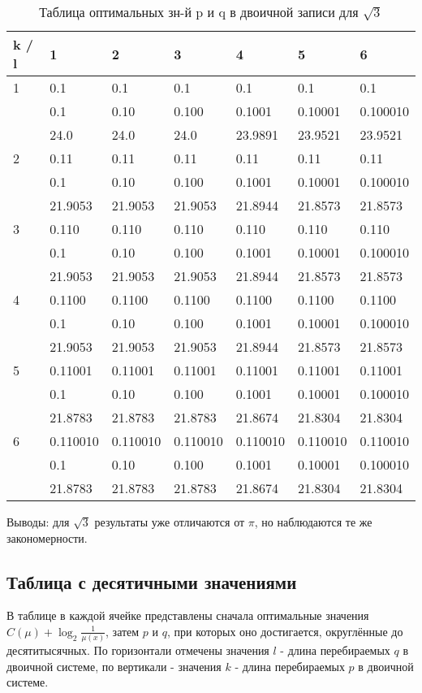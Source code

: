 \documentclass[12pt]{article}
\begin{document}
	\begin{table}[h]
		\caption{Таблица оптимальных зн-й p и q в двоичной записи для $\sqrt{3}$}
		\label{sometable}
		\begin{center}
			\begin{tabular}{|l|l|l|l|l|l|l|}
				\hline
				k / l &1 & 2 & 3 & 4 & 5 & 6\\
				\hline
				1 & 0.1& 0.1& 0.1& 0.1& 0.1& 0.1\\
				& 0.1& 0.10& 0.100& 0.1001& 0.10001& 0.100010\\
				& 24.0& 24.0& 24.0& 23.9891& 23.9521& 23.9521\\
				\hline
				2 & 0.11& 0.11& 0.11& 0.11& 0.11& 0.11\\
				& 0.1& 0.10& 0.100& 0.1001& 0.10001& 0.100010\\
				& 21.9053& 21.9053& 21.9053& 21.8944& 21.8573& 21.8573\\
				\hline
				3 & 0.110& 0.110& 0.110& 0.110& 0.110& 0.110\\
				& 0.1& 0.10& 0.100& 0.1001& 0.10001& 0.100010\\
				& 21.9053& 21.9053& 21.9053& 21.8944& 21.8573& 21.8573\\
				\hline
				4 & 0.1100& 0.1100& 0.1100& 0.1100& 0.1100& 0.1100\\
				& 0.1& 0.10& 0.100& 0.1001& 0.10001& 0.100010\\
				& 21.9053& 21.9053& 21.9053& 21.8944& 21.8573& 21.8573\\
				\hline
				5 & 0.11001& 0.11001& 0.11001& 0.11001& 0.11001& 0.11001\\
				& 0.1& 0.10& 0.100& 0.1001& 0.10001& 0.100010\\
				& 21.8783& 21.8783& 21.8783& 21.8674& 21.8304& 21.8304\\
				\hline
				6 & 0.110010& 0.110010& 0.110010& 0.110010& 0.110010& 0.110010\\
				& 0.1& 0.10& 0.100& 0.1001& 0.10001& 0.100010\\
				& 21.8783& 21.8783& 21.8783& 21.8674& 21.8304& 21.8304\\
				\hline
			\end{tabular}
		\end{center}
	\end{table}
	
	Выводы: для $\sqrt{3}$ результаты уже отличаются от $\pi$, но наблюдаются те же закономерности.
	
	\subsection*{Таблица с десятичными значениями}
	В таблице в каждой ячейке представлены сначала оптимальные значения $C(\mu)+\log_2{\frac{1}{\mu(x)}}$, затем $p$ и $q$, при которых оно достигается, округлённые до десятитысячных. По горизонтали отмечены значения $l$ - длина перебираемых $q$  в двоичной системе, по вертикали - значения $k$ - длина перебираемых $p$  в двоичной системе.
	
\end{document}
